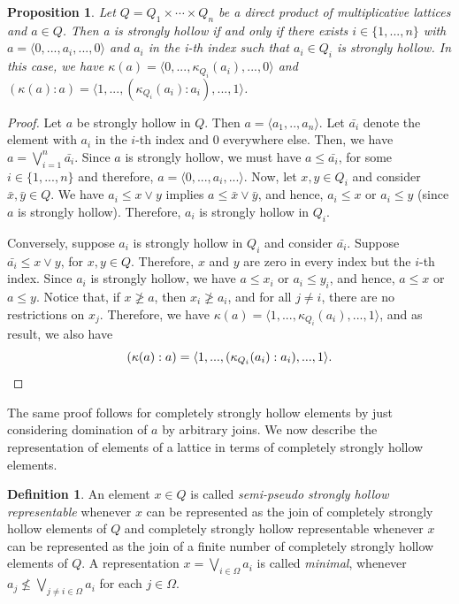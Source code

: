 \documentclass[11pt,english]{amsart}
\newtheorem{proposition}[theorem]{Proposition}
\theoremstyle{definition}
\newtheorem{definition}{Definition}[section]
\numberwithin{equation}{section}
\theoremstyle{remark}
\def\leq{\leqslant}
\begin{document}
	\begin{proposition}\label{T4.2}
		Let $Q=Q_1\times\cdots\times Q_n$ be a direct product of multiplicative lattices and $a\in Q$. Then a is strongly hollow if and only if there exists $i\in \{1,...,n\}$ with $a=\langle 0,...,a_i,...,0\rangle$ and $a_i$ in the i-th index such that $a_i\in Q_i$ is strongly hollow. In this case, we have  $\kappa(a)=\langle 0,...,\kappa_{Q_i}(a_i),...,0\rangle $ and \((\kappa(a):a)=\langle 1,...,(\kappa_{Q_i}(a_i):a_i),...,1\rangle\).
	\end{proposition}
	\begin{proof}
		Let $a$ be strongly hollow in $Q$. Then $a=\langle a_1,..,a_n\rangle $. Let $\bar{a_i}$ denote the element with $a_i$ in the $i$-th index and $0$ everywhere else. Then, we have 
		$a=\bigvee_{i=1}^n\bar{a_i}$. Since $a$ is strongly hollow, we must have $a\leq \bar{a_i}$, for some $i\in\{1,...,n\}$ and therefore, $a=\langle 0,...,a_i,...\rangle $. Now, let $x,y\in Q_i$ and consider $\bar{x},\bar{y}\in Q$. We have  $a_i\leq x\vee y$ implies $a\leq\bar{x}\vee\bar{y}$, and hence,  $a_i\leq x$ or $a_i\leq y$ (since $a$ is strongly hollow). Therefore, $a_i$ is strongly hollow in $Q_i$.
		
		Conversely, suppose $a_i$ is strongly hollow in $Q_i$ and consider $\bar{a_i}$. Suppose $\bar{a_i}\leq x\vee y$, for $x,y\in Q$. Therefore, $x$ and $y$ are zero in every index but the $i$-th index. Since $a_i$ is strongly hollow, we have  $a\leq x_i$ or $a_i\leq y_i$, and hence, $a\leq x$ or $a\leq y$. Notice that, if $x\ngeq a$, then $x_i\ngeq a_i$, and for all $j\neq i$, there are no restrictions on $x_j$. Therefore, we have  $\kappa(a)=\langle 1,...,\kappa_{Q_i}(a_i),...,1\rangle$, and as result, we also have  \[(\kappa(a):a)=\langle 1,...,(\kappa_{Q_i}(a_i):a_i),...,1\rangle.\qedhere\]
	\end{proof}
	
	The same proof follows for completely strongly hollow elements by just considering domination of $a$ by arbitrary joins. We now describe the representation of elements of a lattice in terms of completely strongly hollow elements.
	
	\begin{definition}
		An element $x\in Q$ is called \emph{semi-pseudo strongly hollow representable} whenever $x$ can be represented as the join of completely strongly hollow elements of $Q$ and {completely strongly hollow representable} whenever $x$ can be represented as the join of a finite number of completely strongly hollow elements of $Q$. A representation $x=\bigvee_{i\in \Omega} a_i$ is called \emph{minimal}, whenever $a_j\nleq \bigvee_{j\neq i\in \Omega}a_i$ for each $j\in \Omega$.
	\end{definition}
	
\end{document}
